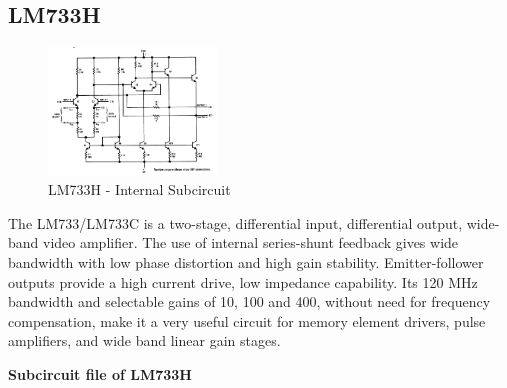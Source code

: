 \documentclass[12pt,a4paper]{report}
\begin{document}
\subsection{LM733H}
\begin{figure} %
	\centering
	\includegraphics[width=0.4\textwidth]{lm733h_sub}
	\caption{LM733H - Internal Subcircuit}
\end{figure}
The LM733/LM733C is a two-stage, differential input, differential output, wide-band video amplifier. The use of internal series-shunt feedback gives wide bandwidth with low phase distortion and high gain stability. Emitter-follower outputs provide a high current drive, low impedance capability. Its 120 MHz bandwidth and selectable gains of 10, 100 and 400, without need for frequency compensation, make it a very useful circuit for memory element drivers, pulse amplifiers, and wide band linear gain stages.
\vspace{5mm}
\\
\begin{flushleft}
	\textbf{Subcircuit file of LM733H}
\end{flushleft}
\end{document}

